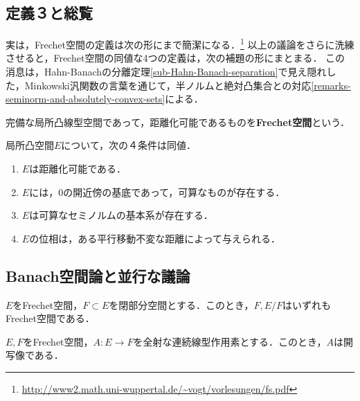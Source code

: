 \documentclass[uplatex,dvipdfmx]{jsreport}
\begin{document}
\subsection{定義３と総覧}

\begin{tcolorbox}[colframe=ForestGreen, colback=ForestGreen!10!white,breakable,colbacktitle=ForestGreen!40!white,coltitle=black,fonttitle=\bfseries\sffamily,
title=]
    実は，Frechet空間の定義は次の形にまで簡潔になる．\footnote{\url{http://www2.math.uni-wuppertal.de/~vogt/vorlesungen/fs.pdf}}
    以上の議論をさらに洗練させると，Frechet空間の同値な4つの定義は，次の補題の形にまとまる．
    この消息は，Hahn-Banachの分離定理\ref{sub-Hahn-Banach-separation}で見え隠れした，Minkowski汎関数の言葉を通じて，半ノルムと絶対凸集合との対応\ref{remarks-seminorm-and-absolutely-convex-sets}による．
\end{tcolorbox}

\begin{definition}
    完備な局所凸線型空間であって，距離化可能であるものを\textbf{Frechet空間}という．
\end{definition}

\begin{lemma}[Frechet空間の特徴付け]
    局所凸空間$E$について，次の４条件は同値．
    \begin{enumerate}
        \item $E$は距離化可能である．
        \item $E$には，$0$の開近傍の基底であって，可算なものが存在する．
        \item $E$は可算なセミノルムの基本系が存在する．
        \item $E$の位相は，ある平行移動不変な距離によって与えられる．
    \end{enumerate}
\end{lemma}

\subsection{Banach空間論と並行な議論}

\begin{proposition}
    $E$をFrechet空間，$F\subset E$を閉部分空間とする．このとき，$F,E/F$はいずれもFrechet空間である．
\end{proposition}

\begin{theorem}[開写像定理]
    $E,F$をFrechet空間，$A:E\to F$を全射な連続線型作用素とする．このとき，$A$は開写像である．
\end{theorem}
\end{document}
